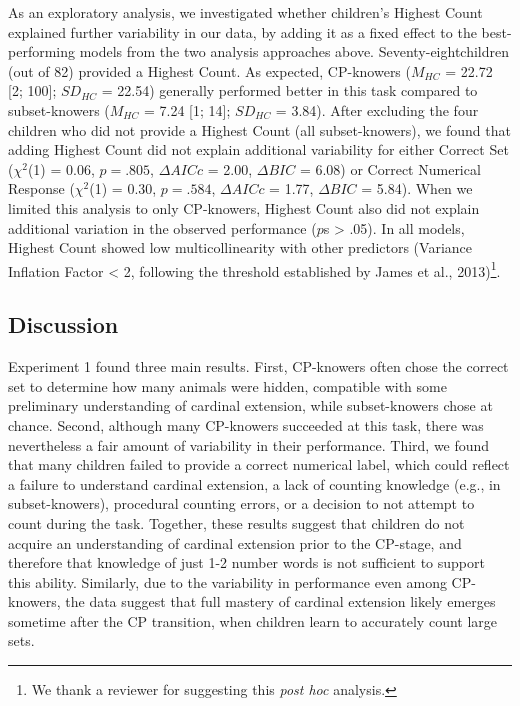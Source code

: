 \documentclass[
  man,floatsintext]{apa7}
\begin{document}
As an exploratory analysis, we investigated whether children's Highest Count explained further variability in our data, by adding it as a fixed effect to the best-performing models from the two analysis approaches above. Seventy-eightchildren (out of 82) provided a Highest Count. As expected, CP-knowers (\(M_{HC}\) = 22.72 {[}2; 100{]}; \(SD_{HC}\) = 22.54) generally performed better in this task compared to subset-knowers (\(M_{HC}\) = 7.24 {[}1; 14{]}; \(SD_{HC}\) = 3.84). After excluding the four children who did not provide a Highest Count (all subset-knowers), we found that adding Highest Count did not explain additional variability for either Correct Set (\(\chi^2\)(1) = 0.06, \(p = .805\), \(\Delta AICc\) = 2.00, \(\Delta BIC\) = 6.08) or Correct Numerical Response (\(\chi^2\)(1) = 0.30, \(p = .584\), \(\Delta AICc\) = 1.77, \(\Delta BIC\) = 5.84). When we limited this analysis to only CP-knowers, Highest Count also did not explain additional variation in the observed performance (\(p\)s \textgreater{} .05). In all models, Highest Count showed low multicollinearity with other predictors (Variance Inflation Factor \textless{} 2, following the threshold established by James et al., 2013)\footnote{We thank a reviewer for suggesting this \emph{post hoc} analysis.}.

\subsection{Discussion}\label{discussion}

Experiment 1 found three main results. First, CP-knowers often chose the correct set to determine how many animals were hidden, compatible with some preliminary understanding of cardinal extension, while subset-knowers chose at chance. Second, although many CP-knowers succeeded at this task, there was nevertheless a fair amount of variability in their performance. Third, we found that many children failed to provide a correct numerical label, which could reflect a failure to understand cardinal extension, a lack of counting knowledge (e.g., in subset-knowers), procedural counting errors, or a decision to not attempt to count during the task. Together, these results suggest that children do not acquire an understanding of cardinal extension prior to the CP-stage, and therefore that knowledge of just 1-2 number words is not sufficient to support this ability. Similarly, due to the variability in performance even among CP-knowers, the data suggest that full mastery of cardinal extension likely emerges sometime after the CP transition, when children learn to accurately count large sets.
\end{document}

